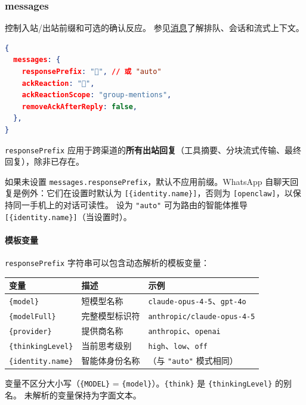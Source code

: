 \subsubsection{messages}


控制入站/出站前缀和可选的确认反应。
参见\href{/concepts/messages}{消息}了解排队、会话和流式上下文。

\begin{lstlisting}[language=json]
{
  messages: {
    responsePrefix: "🦞", // 或 "auto"
    ackReaction: "👀",
    ackReactionScope: "group-mentions",
    removeAckAfterReply: false,
  },
}
\end{lstlisting}


\texttt{responsePrefix} 应用于跨渠道的\textbf{所有出站回复}（工具摘要、分块流式传输、最终回复），除非已存在。

如果未设置 \texttt{messages.responsePrefix}，默认不应用前缀。WhatsApp 自聊天回复是例外：它们在设置时默认为 \texttt{[\{identity.name\}]}，否则为 \texttt{[openclaw]}，以保持同一手机上的对话可读性。
设为 \texttt{"auto"} 可为路由的智能体推导 \texttt{[\{identity.name\}]}（当设置时）。

\paragraph{模板变量}


\texttt{responsePrefix} 字符串可以包含动态解析的模板变量：


\begin{table}[h]
\centering
\small
\begin{tabular}{|l|l|l|}
\hline
变量 & 描述 & 示例 \\
\hline
\texttt{\{model\}} & 短模型名称 & \texttt{claude-opus-4-5}、\texttt{gpt-4o} \\
\hline
\texttt{\{modelFull\}} & 完整模型标识符 & \texttt{anthropic/claude-opus-4-5} \\
\hline
\texttt{\{provider\}} & 提供商名称 & \texttt{anthropic}、\texttt{openai} \\
\hline
\texttt{\{thinkingLevel\}} & 当前思考级别 & \texttt{high}、\texttt{low}、\texttt{off} \\
\hline
\texttt{\{identity.name\}} & 智能体身份名称 & （与 \texttt{"auto"} 模式相同） \\
\hline
\end{tabular}
\end{table}



变量不区分大小写（\texttt{\{MODEL\}} = \texttt{\{model\}}）。\texttt{\{think\}} 是 \texttt{\{thinkingLevel\}} 的别名。
未解析的变量保持为字面文本。


